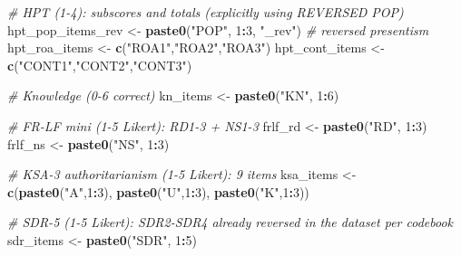 \documentclass[
  10pt,
]{article}
\newenvironment{Shaded}{\begin{snugshade}}{\end{snugshade}}
\newcommand{\CommentTok}[1]{\textcolor[rgb]{0.56,0.35,0.01}{\textit{#1}}}
\newcommand{\DecValTok}[1]{\textcolor[rgb]{0.00,0.00,0.81}{#1}}
\newcommand{\FunctionTok}[1]{\textcolor[rgb]{0.13,0.29,0.53}{\textbf{#1}}}
\newcommand{\NormalTok}[1]{#1}
\newcommand{\OtherTok}[1]{\textcolor[rgb]{0.56,0.35,0.01}{#1}}
\newcommand{\SpecialCharTok}[1]{\textcolor[rgb]{0.81,0.36,0.00}{\textbf{#1}}}
\newcommand{\StringTok}[1]{\textcolor[rgb]{0.31,0.60,0.02}{#1}}
\begin{document}
\begin{Shaded}
\begin{Highlighting}[]
\CommentTok{\# HPT (1{-}4): subscores and totals (explicitly using REVERSED POP)}
\NormalTok{hpt\_pop\_items\_rev  }\OtherTok{\textless{}{-}} \FunctionTok{paste0}\NormalTok{(}\StringTok{"POP"}\NormalTok{, }\DecValTok{1}\SpecialCharTok{:}\DecValTok{3}\NormalTok{, }\StringTok{"\_rev"}\NormalTok{)   }\CommentTok{\# reversed presentism}
\NormalTok{hpt\_roa\_items      }\OtherTok{\textless{}{-}} \FunctionTok{c}\NormalTok{(}\StringTok{"ROA1"}\NormalTok{,}\StringTok{"ROA2"}\NormalTok{,}\StringTok{"ROA3"}\NormalTok{)}
\NormalTok{hpt\_cont\_items     }\OtherTok{\textless{}{-}} \FunctionTok{c}\NormalTok{(}\StringTok{"CONT1"}\NormalTok{,}\StringTok{"CONT2"}\NormalTok{,}\StringTok{"CONT3"}\NormalTok{)}

\CommentTok{\# Knowledge (0{-}6 correct)}
\NormalTok{kn\_items }\OtherTok{\textless{}{-}} \FunctionTok{paste0}\NormalTok{(}\StringTok{"KN"}\NormalTok{, }\DecValTok{1}\SpecialCharTok{:}\DecValTok{6}\NormalTok{)}

\CommentTok{\# FR{-}LF mini (1{-}5 Likert): RD1{-}3 + NS1{-}3}
\NormalTok{frlf\_rd }\OtherTok{\textless{}{-}} \FunctionTok{paste0}\NormalTok{(}\StringTok{"RD"}\NormalTok{, }\DecValTok{1}\SpecialCharTok{:}\DecValTok{3}\NormalTok{)}
\NormalTok{frlf\_ns }\OtherTok{\textless{}{-}} \FunctionTok{paste0}\NormalTok{(}\StringTok{"NS"}\NormalTok{, }\DecValTok{1}\SpecialCharTok{:}\DecValTok{3}\NormalTok{)}

\CommentTok{\# KSA{-}3 authoritarianism (1{-}5 Likert): 9 items}
\NormalTok{ksa\_items }\OtherTok{\textless{}{-}} \FunctionTok{c}\NormalTok{(}\FunctionTok{paste0}\NormalTok{(}\StringTok{"A"}\NormalTok{,}\DecValTok{1}\SpecialCharTok{:}\DecValTok{3}\NormalTok{), }\FunctionTok{paste0}\NormalTok{(}\StringTok{"U"}\NormalTok{,}\DecValTok{1}\SpecialCharTok{:}\DecValTok{3}\NormalTok{), }\FunctionTok{paste0}\NormalTok{(}\StringTok{"K"}\NormalTok{,}\DecValTok{1}\SpecialCharTok{:}\DecValTok{3}\NormalTok{))}

\CommentTok{\# SDR{-}5 (1{-}5 Likert): SDR2{-}SDR4 already reversed in the dataset per codebook}
\NormalTok{sdr\_items }\OtherTok{\textless{}{-}} \FunctionTok{paste0}\NormalTok{(}\StringTok{"SDR"}\NormalTok{, }\DecValTok{1}\SpecialCharTok{:}\DecValTok{5}\NormalTok{)}


\end{Highlighting}
\end{Shaded}
\end{document}
